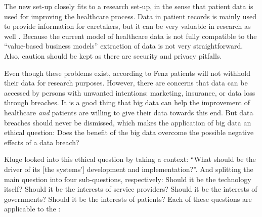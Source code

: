The new set-up closely fits to a research set-up, in the sense that patient data is used for improving the healthcare process.
Data in patient records is mainly used to provide information for caretakers, but it can be very valuable in research as well \cite{s15Fenz2014}.
Because the current model of healthcare data is not fully compatible to the ``value-based business models'' extraction of data is not very straightforward.
Also, caution should be kept as there are security and privacy pitfalls.

Even though these problems exist, according to Fenz \cite{s15Fenz2014} patients will not withhold their data for research purposes.
However, there are concerns that data can be accessed by persons with unwanted intentions: marketing, insurance, or data loss through breaches.
It is a good thing that big data can help the improvement of healthcare \emph{and} patients are willing to give their data towards this end.
But data breaches should never be dismissed, which makes the application of big data an ethical question: Does the benefit of the big data overcome the possible negative effects of a data breach?

Kluge \cite{s7Kluge2007} looked into this ethical question by taking a context: ``What should be the driver of its [the systems'] development and implementation?''. 
And splitting the main question into four sub-questions, respectively: Should it be the technology itself? Should it be the interests of service providers? Should it be the interests of governments? Should it be the interests of patients?
Each of these questions are applicable to the \project{}:

